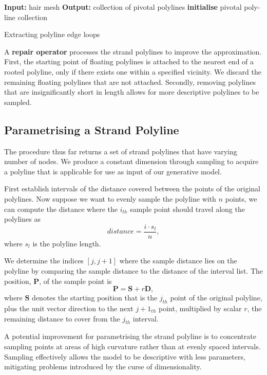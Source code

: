\documentclass[ %
author={Dillon Keith Diep},
supervisor={Dr. Carl Henrik Ek},
degree={MEng},
title={ART-CG Hair:},
subtitle={Assisted Real-time Content Generation of Stylised Virtual Hair},
type={Research},
year={2017} ]{dissertation}
\begin{document}
\begin{algorithm}[!h]
	\algrule
	\textbf{Input:} hair mesh\;
	\textbf{Output:} collection of pivotal polylines\;
	\algrule
	\textbf{initialise}\;
	\Return pivotal poly-line collection\;
	\caption{Extracting polyline edge loops}
\end{algorithm}

A \textbf{repair operator} processes the strand polylines to improve the approximation. First, the starting point of floating polylines is attached to the nearest end of a rooted polyline, only if there exists one within a specified vicinity. We discard the remaining floating polylines that are not attached. Secondly, removing polylines that are insignificantly short in length allows for more descriptive polylines to be sampled.

\subsection{Parametrising a Strand Polyline}
The procedure thus far returns a set of strand polylines that have varying number of nodes. We produce a constant dimension through sampling to acquire a polyline that is applicable for use as input of our generative model.

First establish intervals of the distance covered between the points of the original polylines. Now suppose we want to evenly sample the polyline with $n$ points, we can compute the distance where the $i_{th}$ sample point should travel along the polylines as
$$distance=\frac{i \cdot s_l}{n},$$
where $s_l$ is the polyline length.

We determine the indices $[j, j+1]$ where the sample distance lies on the polyline by comparing the sample distance to the distance of the interval list. The position, $\bm{P}$, of the sample point is
$$\bm{P} = \bm{S} + r\bm{D},$$
where $\bm{S}$ denotes the starting position that is the $j_{th}$ point of the original polyline, plus the unit vector direction to the next $j+1_{th}$ point, multiplied by scalar $r$, the remaining distance to cover from the $j_{th}$ interval.

A potential improvement for parametrising the strand polyline is to concentrate sampling points at areas of high curvature rather than at evenly spaced intervals. Sampling effectively allows the model to be descriptive with less parameters, mitigating problems introduced by the curse of dimensionality.
\end{document}
